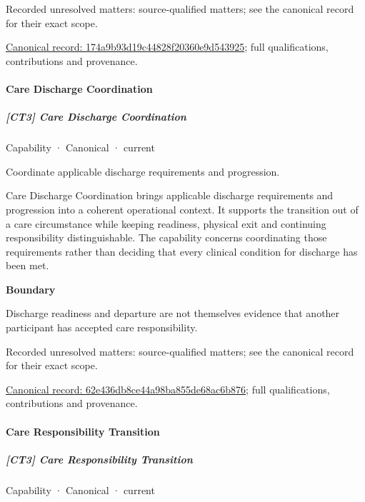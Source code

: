 {\small Recorded unresolved matters: source-qualified matters; see the canonical record for their exact scope.}\par
{\footnotesize \href{../../../../continuum/strategy/capability/174a9b93d19c44828f20360e9d543925.md}{Canonical record: 174a9b93d19c44828f20360e9d543925}; full qualifications, contributions and provenance.}\par
\paragraph{Care Discharge Coordination}

\subparagraph{[CT3] Care Discharge Coordination}

\label{element:62e436db8ce44a98ba855de68ac6b876}
{\small Capability · Canonical · current}\par

Coordinate applicable discharge requirements and progression.



Care Discharge Coordination brings applicable discharge requirements and progression into a coherent operational context. It supports the transition out of a care circumstance while keeping readiness, physical exit and continuing responsibility distinguishable. The capability concerns coordinating those requirements rather than deciding that every clinical condition for discharge has been met.



\textbf{Boundary}



Discharge readiness and departure are not themselves evidence that another participant has accepted care responsibility.


{\small Recorded unresolved matters: source-qualified matters; see the canonical record for their exact scope.}\par
{\footnotesize \href{../../../../continuum/strategy/capability/62e436db8ce44a98ba855de68ac6b876.md}{Canonical record: 62e436db8ce44a98ba855de68ac6b876}; full qualifications, contributions and provenance.}\par
\paragraph{Care Responsibility Transition}

\subparagraph{[CT3] Care Responsibility Transition}

\label{element:f8c9f7e2dcf14ceb9f228daaf9fed45e}
{\small Capability · Canonical · current}\par

